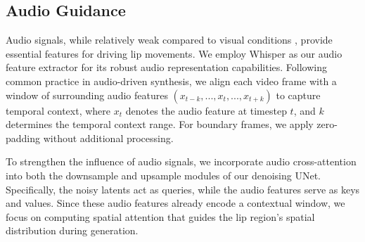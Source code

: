 \subsection{Audio Guidance}
Audio signals, while relatively weak compared to visual conditions \citep{chen2024echomimic,tian2025emo}, provide essential features for driving lip movements. We employ Whisper \citep{radford2023robust} as our audio feature extractor for its robust audio representation capabilities. Following common practice in audio-driven synthesis, we align each video frame with a window of surrounding audio features $(x_{t-k}, ..., x_t, ..., x_{t+k})$ to capture temporal context, where $x_t$ denotes the audio feature at timestep $t$, and $k$ determines the temporal context range. For boundary frames, we apply zero-padding without additional processing.

To strengthen the influence of audio signals, we incorporate audio cross-attention into both the downsample and upsample modules of our denoising UNet. Specifically, the noisy latents act as queries, while the audio features serve as keys and values. Since these audio features already encode a contextual window, we focus on computing spatial attention that guides the lip region’s spatial distribution during generation.

